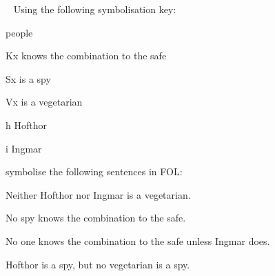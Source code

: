 \
\problempart
\label{pr.FOLvegetarians}
Using the following symbolisation key:
\begin{ekey}
\item[\text{domain}] people
\item[Kx]  knows the combination to the safe
\item[Sx]  is a spy
\item[Vx] \gap{x} is a vegetarian
\item[h] Hofthor
\item[i] Ingmar
\end{ekey}
symbolise the following sentences in FOL:
\begin{earg}
\item Neither Hofthor nor Ingmar is a vegetarian.
\item[] 
\item No spy knows the combination to the safe.
\item[] 
\item No one knows the combination to the safe unless Ingmar does.
\item[] \myanswer{$\forall x \enot Kx \eor Ki$}
\item Hofthor is a spy, but no vegetarian is a spy.
\item[] 
\end{earg}


